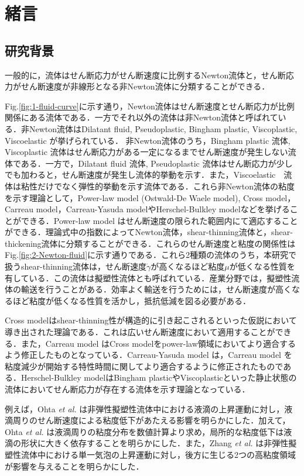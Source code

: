 \section{緒言}

\subsection{研究背景}

一般的に，流体はせん断応力がせん断速度に比例するNewton流体と，せん断応力がせん断速度が非線形となる非Newton流体に分類することができる．

Fig.\ref{fig:1-fluid-curve}に示す通り，Newton流体はせん断速度とせん断応力が比例関係にある流体である．一方でそれ以外の流体は非Newton流体と呼ばれている．非Newton流体はDilatant fluid, Pseudoplastic, Bingham plastic, Viscoplastic, Viscoelastic が挙げられている．
非Newton流体のうち，Bingham plastic 流体, Viscoplastic 流体はせん断応力がある一定になるまでせん断速度が発生しない流体である．一方で，Dilatant fluid 流体, Pseudoplastic 流体はせん断応力が少しでも加わると，せん断速度が発生し流体的挙動を示す．また，Viscoelastic　流体は粘性だけでなく弾性的挙動を示す流体である．これら非Newton流体の粘度を示す理論として，Power-law model (Ostwald-De Waele model), Cross model，Carreau model，Carreau-Yasuda modelやHerschel-Bulkley modelなどを挙げることができる\cite{ref:1}．Power-law model はせん断速度の限られた範囲内にて適応することができる．理論式中の指数によってNewton流体，shear-thinning流体と，shear-thickening流体に分類することができる．これらのせん断速度と粘度の関係性はFig.\ref{fig:2-Newton-fluid}に示す通りである．これら2種類の流体のうち，本研究で扱うshear-thinning流体は，せん断速度$\dot{\gamma}$が高くなるほど粘度$\mu$が低くなる性質を有している．この流体は擬塑性流体とも呼ばれている．産業分野では，擬塑性流体の輸送を行うことがある．効率よく輸送を行うためには，せん断速度が高くなるほど粘度が低くなる性質を活かし，抵抗低減を図る必要がある．

Cross modelはshear-thinning性が構造的に引き起こされるといった仮説において導き出された理論である．これは広いせん断速度において適用することができる．また，Carreau model はCross modelをpower-law領域においてより適合するよう修正したものとなっている．Carreau-Yasuda model は，Carreau model を粘度減少が開始する特性時間に関してより適合するように修正されたものである．Herschel-Bulkley modelはBingham plasticやViscoplasticといった静止状態の流体においてせん断応力が存在する流体を示す理論となっている\cite{ref:1}．

例えば，Ohta {\it et al.} \cite{ref:2}は非弾性擬塑性流体中における液滴の上昇運動に対し，液滴周りのせん断速度による粘度低下があたえる影響を明らかにした．加えて，Ohta {\it et al.} \cite{ref:3}は液滴周りの粘度分布を数値計算より求め，局所的な粘度低下は液滴の形状に大きく依存することを明らかにした．また，Zhang {\it et al.} \cite{ref:4}は非弾性擬塑性流体中における単一気泡の上昇運動に対し，後方に生じる2つの高粘度領域が影響を与えることを明らかにした．


